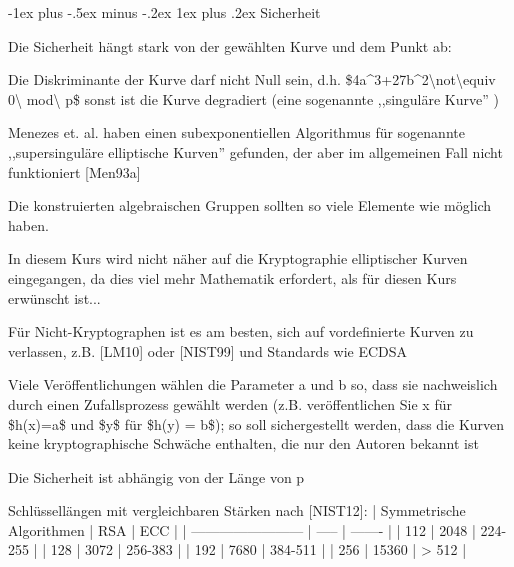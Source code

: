 \documentclass[a4paper]{article}
\makeatletter
\renewcommand{\subsubsection}{\@startsection{subsubsection}{3}{0mm}%
 {-1ex plus -.5ex minus -.2ex}%
 {1ex plus .2ex}%
 {\normalfont\small\bfseries}}
\makeatother
\begin{document}
\begin{multicols}{3}
      \subsubsection{Sicherheit}

      \begin{itemize*}
            \item Die Sicherheit hängt stark von der gewählten Kurve und dem Punkt ab:
            \item Die Diskriminante der Kurve darf nicht Null sein, d.h.
            \$4a\^{}3+27b\^{}2\textbackslash not\textbackslash equiv
            0\textbackslash{} mod\textbackslash{} p\$ sonst ist die Kurve
            degradiert (eine sogenannte ,,singuläre Kurve'' )
            \item Menezes et. al. haben einen subexponentiellen Algorithmus für
            sogenannte ,,supersinguläre elliptische Kurven'' gefunden, der aber im
            allgemeinen Fall nicht funktioniert {[}Men93a{]}
            \item Die konstruierten algebraischen Gruppen sollten so viele Elemente wie
            möglich haben.
            \item In diesem Kurs wird nicht näher auf die Kryptographie elliptischer
            Kurven eingegangen, da dies viel mehr Mathematik erfordert, als für
            diesen Kurs erwünscht ist...
            \item Für Nicht-Kryptographen ist es am besten, sich auf vordefinierte
            Kurven zu verlassen, z.B. {[}LM10{]} oder {[}NIST99{]} und Standards
            wie ECDSA
            \item Viele Veröffentlichungen wählen die Parameter a und b so, dass sie
            nachweislich durch einen Zufallsprozess gewählt werden (z.B.
            veröffentlichen Sie x für \$h(x)=a\$ und \$y\$ für \$h(y) = b\$); so
            soll sichergestellt werden, dass die Kurven keine kryptographische
            Schwäche enthalten, die nur den Autoren bekannt ist
            \item Die Sicherheit ist abhängig von der Länge von p
            \begin{itemize*}
                  \item Schlüssellängen mit vergleichbaren Stärken nach {[}NIST12{]}: | Symmetrische Algorithmen | RSA | ECC | | ------------------------ | ----- | ------- | | 112 | 2048 | 224-255 | | 128 | 3072 | 256-383 | | 192 | 7680 | 384-511 | | 256 | 15360 | \textgreater{} 512 |
            \end{itemize*}

\end{itemize*}
\end{multicols}
\end{document}
